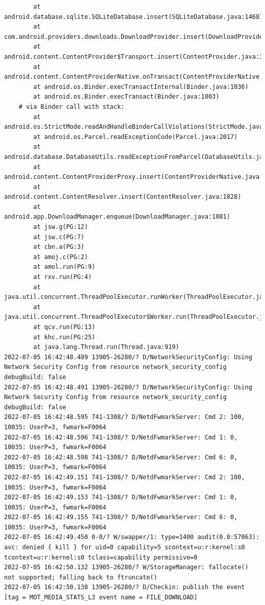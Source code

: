 \documentclass[a4paper,12pt]{book}
\begin{document}
\begin{lstlisting}
        at android.database.sqlite.SQLiteDatabase.insert(SQLiteDatabase.java:1468)
        at com.android.providers.downloads.DownloadProvider.insert(DownloadProvider.java:972)
        at android.content.ContentProvider$Transport.insert(ContentProvider.java:309)
        at android.content.ContentProviderNative.onTransact(ContentProviderNative.java:154)
        at android.os.Binder.execTransactInternal(Binder.java:1036)
        at android.os.Binder.execTransact(Binder.java:1003)
    # via Binder call with stack:
        at android.os.StrictMode.readAndHandleBinderCallViolations(StrictMode.java:2289)
        at android.os.Parcel.readExceptionCode(Parcel.java:2017)
        at android.database.DatabaseUtils.readExceptionFromParcel(DatabaseUtils.java:137)
        at android.content.ContentProviderProxy.insert(ContentProviderNative.java:481)
        at android.content.ContentResolver.insert(ContentResolver.java:1828)
        at android.app.DownloadManager.enqueue(DownloadManager.java:1081)
        at jsw.g(PG:12)
        at jsw.c(PG:7)
        at cbn.a(PG:3)
        at amoj.c(PG:2)
        at amol.run(PG:9)
        at rxv.run(PG:4)
        at java.util.concurrent.ThreadPoolExecutor.runWorker(ThreadPoolExecutor.java:1167)
        at java.util.concurrent.ThreadPoolExecutor$Worker.run(ThreadPoolExecutor.java:641)
        at qcv.run(PG:13)
        at khc.run(PG:25)
        at java.lang.Thread.run(Thread.java:919)
2022-07-05 16:42:48.489 13905-26280/? D/NetworkSecurityConfig: Using Network Security Config from resource network_security_config debugBuild: false
2022-07-05 16:42:48.491 13905-26280/? D/NetworkSecurityConfig: Using Network Security Config from resource network_security_config debugBuild: false
2022-07-05 16:42:48.595 741-1308/? D/NetdFwmarkServer: Cmd 2: 100, 10035: UserP=3, fwmark=F0064
2022-07-05 16:42:48.596 741-1308/? D/NetdFwmarkServer: Cmd 1: 0, 10035: UserP=3, fwmark=F0064
2022-07-05 16:42:48.598 741-1308/? D/NetdFwmarkServer: Cmd 6: 0, 10035: UserP=3, fwmark=F0064
2022-07-05 16:42:49.151 741-1308/? D/NetdFwmarkServer: Cmd 2: 100, 10035: UserP=3, fwmark=F0064
2022-07-05 16:42:49.153 741-1308/? D/NetdFwmarkServer: Cmd 1: 0, 10035: UserP=3, fwmark=F0064
2022-07-05 16:42:49.155 741-1308/? D/NetdFwmarkServer: Cmd 6: 0, 10035: UserP=3, fwmark=F0064
2022-07-05 16:42:49.450 0-0/? W/swapper/1: type=1400 audit(0.0:57063): avc: denied { kill } for uid=0 capability=5 scontext=u:r:kernel:s0 tcontext=u:r:kernel:s0 tclass=capability permissive=0
2022-07-05 16:42:50.132 13905-26280/? W/StorageManager: fallocate() not supported; falling back to ftruncate()
2022-07-05 16:42:50.138 13905-26280/? D/Checkin: publish the event [tag = MOT_MEDIA_STATS_L3 event name = FILE_DOWNLOAD]

\end{lstlisting}
\end{document}
